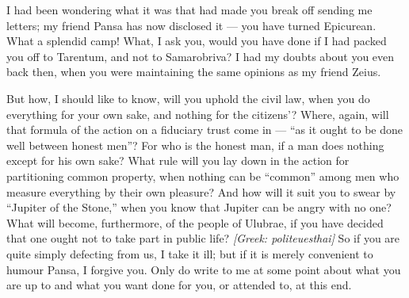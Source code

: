 

 I had been wondering what it was that had made you break off sending me letters; my friend Pansa has now disclosed it --- you have turned Epicurean. What a splendid camp! What, I ask you, would you have done if I had packed you off to Tarentum, and not to Samarobriva? I had my doubts about you even back then, when you were maintaining the same opinions as my friend Zeius.

 But how, I should like to know, will you uphold the civil law, when you do everything for your own sake, and nothing for the citizens'? Where, again, will that formula of the action on a fiduciary trust come in --- ``as it ought to be done well between honest men''? For who is the honest man, if a man does nothing except for his own sake? What rule will you lay down in the action for partitioning common property, when nothing can be ``common'' among men who measure everything by their own pleasure? And how will it suit you to swear by ``Jupiter of the Stone,'' when you know that Jupiter can be angry with no one? What will become, furthermore, of the people of Ulubrae, if you have decided that one ought not to take part in public life? \textit{[Greek: politeuesthai]} So if you are quite simply defecting from us, I take it ill; but if it is merely convenient to humour Pansa, I forgive you. Only do write to me at some point about what you are up to and what you want done for you, or attended to, at this end.

